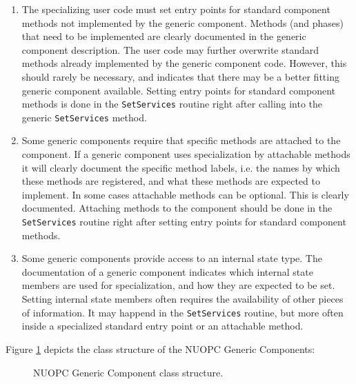 \begin{enumerate}

\item The specializing user code must set entry points for standard component methods not implemented by the generic component. Methods (and phases) that need to be implemented are clearly documented in the generic component description. The user code may further overwrite standard methods already implemented by the generic component code. However, this should rarely be necessary, and indicates that there may be a better fitting generic component available. Setting entry points for standard component methods is done in the {\tt SetServices} routine right after calling into the generic {\tt SetServices} method.

\item Some generic components require that specific methods are attached to the component. If a generic component uses specialization by attachable methods it will clearly document the specific method labels, i.e. the names by which these methods are registered, and what these methods are expected to implement. In some cases attachable methods can be optional. This is clearly documented. Attaching methods to the component should be done in the {\tt SetServices} routine right after setting entry points for standard component methods.

\item Some generic components provide access to an internal state type. The documentation of a generic component indicates which internal state members are used for specialization, and how they are expected to be set. Setting internal state members often requires the availability of other pieces of information. It may happend in the {\tt SetServices} routine, but more often inside a specialized standard entry point or an attachable method.

\end{enumerate}

Figure \ref{fig:NUOPCGenericComp} depicts the class structure of the NUOPC Generic Components:
\begin{figure}
\begin{center}
\end{center}
\caption{NUOPC Generic Component class structure.}
\label{fig:NUOPCGenericComp}
\end{figure}



